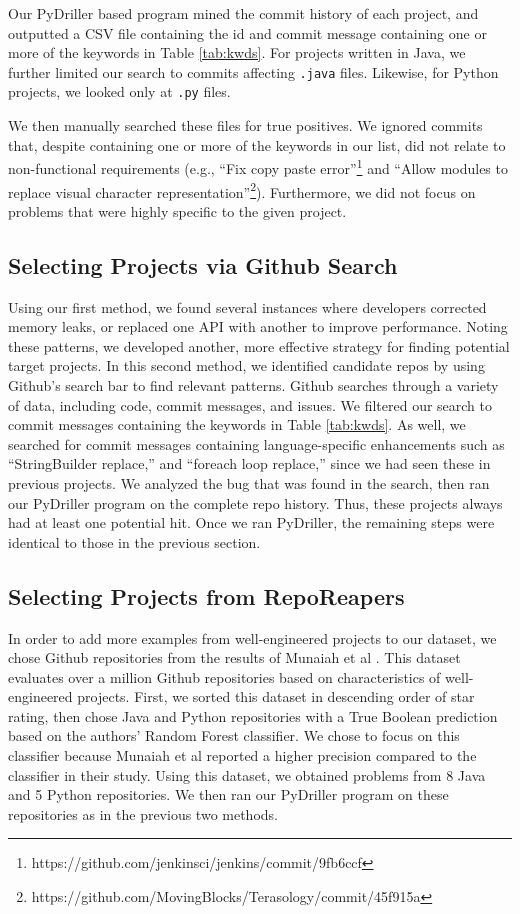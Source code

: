 \documentclass[sigconf]{acmart}
\begin{document}
Our PyDriller based program mined the commit history of each project, and outputted a CSV file containing the id and commit message containing one or more of the keywords in Table \ref{tab:kwds}. For projects written in Java, we further limited our search to commits affecting \texttt{.java} files. Likewise, for Python projects, we looked only at \texttt{.py} files.

We then manually searched these files for true positives. We ignored commits that, despite containing one or more of the keywords in our list, did not relate to non-functional requirements (e.g., ``Fix copy paste error''\footnote{https://github.com/jenkinsci/jenkins/commit/9fb6ccf} and ``Allow modules to replace visual character representation''\footnote{https://github.com/MovingBlocks/Terasology/commit/45f915a}). Furthermore, we did not focus on problems that were highly specific to the given project. 


\subsection{Selecting Projects via Github Search}
Using our first method, we found several instances where developers corrected memory leaks, or replaced one API with another to improve performance. Noting these patterns, we developed another, more effective strategy for finding  potential target projects. In this second method, we identified candidate repos by using Github's search bar to find relevant patterns. Github searches through a variety of data, including code, commit messages, and issues. We filtered our search to commit messages containing the keywords in Table \ref{tab:kwds}. As well, we searched for commit messages containing language-specific enhancements such as ``StringBuilder replace,'' and ``foreach loop replace,'' since we had seen these in previous projects. We analyzed the bug that was found in the search, then ran our PyDriller program on the complete repo history. Thus, these projects always had at least one potential hit. Once we ran PyDriller, the remaining steps were identical to those in the previous section.

\subsection{Selecting Projects from RepoReapers}
In order to add more examples from well-engineered projects to our dataset, we chose Github repositories from the results of Munaiah et al \cite{Munaiah2017}. This dataset evaluates over a million Github repositories based on characteristics of well-engineered projects. First, we sorted this dataset in descending order of star rating, then chose Java and Python repositories with a True Boolean prediction based on the authors' Random Forest classifier. We chose to focus on this classifier because Munaiah et al reported a higher precision compared to the classifier in their study. Using this dataset, we obtained problems from 8 Java and 5 Python repositories. We then ran our PyDriller program on these repositories as in the previous two methods. 
\end{document}
